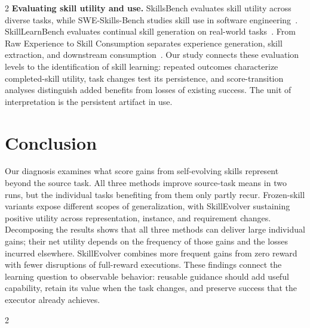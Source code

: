 \documentclass[10pt,letterpaper]{article}
\begin{document}
\begin{multicols}{2}
\noindent\textbf{Evaluating skill utility and use.}
SkillsBench evaluates skill utility across diverse tasks, while SWE-Skills-Bench studies skill use in software engineering~\cite{li2026skillsbench,han2026sweskillsbench}. SkillLearnBench evaluates continual skill generation on real-world tasks~\cite{zhong2026skilllearnbench}. From Raw Experience to Skill Consumption separates experience generation, skill extraction, and downstream consumption~\cite{huang2026rawexperience}. Our study connects these evaluation levels to the identification of skill learning: repeated outcomes characterize completed-skill utility, task changes test its persistence, and score-transition analyses distinguish added benefits from losses of existing success. The unit of interpretation is the persistent artifact in use.

\section{Conclusion}

Our diagnosis examines what score gains from self-evolving skills represent beyond the source task. All three methods improve source-task means in two runs, but the individual tasks benefiting from them only partly recur. Frozen-skill variants expose different scopes of generalization, with SkillEvolver sustaining positive utility across representation, instance, and requirement changes. Decomposing the results shows that all three methods can deliver large individual gains; their net utility depends on the frequency of those gains and the losses incurred elsewhere. SkillEvolver combines more frequent gains from zero reward with fewer disruptions of full-reward executions. These findings connect the learning question to observable behavior: reusable guidance should add useful capability, retain its value when the task changes, and preserve success that the executor already achieves.

\end{multicols}
\clearpage
\begin{multicols}{2}
{\small


}

\end{multicols}
\end{document}
